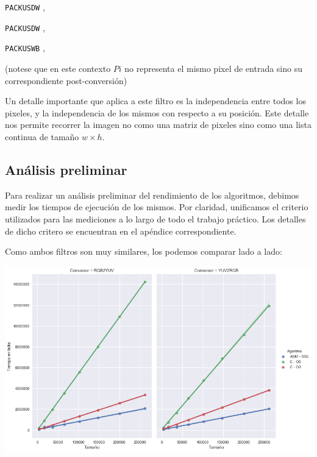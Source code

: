 \begin{center}
	 

	 

	 

	 

	\texttt{PACKUSDW} ,  \hfill

	 

	\texttt{PACKUSDW} ,  \hfill

	 

	\texttt{PACKUSWB} ,  \hfill

	 
\end{center}

(notese que en este contexto $Pi$ no representa el mismo pixel de entrada sino su correspondiente post-conversión)

Un detalle importante que aplica a este filtro es la independencia entre todos los pixeles, y la independencia de los mismos con respecto a su posición. Este detalle nos permite recorrer la imagen no como una matriz de pixeles sino como una lista continua de tamaño $w \times h$.

\subsection{Análisis preliminar}

Para realizar un análisis preliminar del rendimiento de los algoritmos, debimos medir los tiempos de ejecución de los mismos. Por claridad, unificamos el criterio utilizados para las mediciones a lo largo de todo el trabajo práctico. Los detalles de dicho critero se encuentran en el apéndice correspondiente.

Como ambos filtros son muy similares, los podemos comparar lado a lado:

\begin{center}
	\includegraphics[scale=0.5]{img/conversores_CvsASMvsO3.png}
\end{center}


